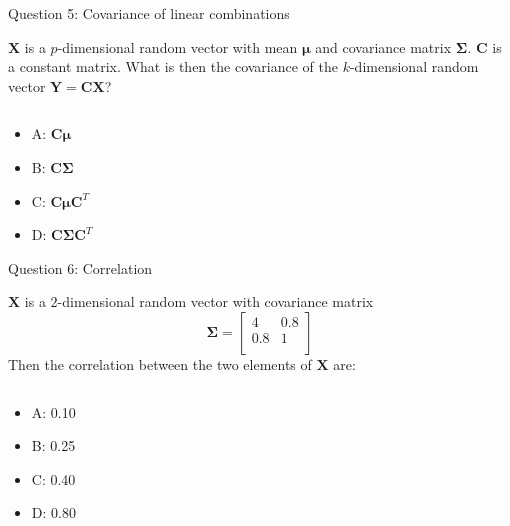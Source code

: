 \documentclass[ignorenonframetext,]{beamer}
\providecommand{\tightlist}{%
  \setlength{\itemsep}{0pt}\setlength{\parskip}{0pt}}
\begin{document}
\begin{frame}

\begin{block}{Question 5: Covariance of linear combinations}

\vspace{2mm}

\(\boldsymbol{X}\) is a \(p\)-dimensional random vector with mean
\(\boldsymbol{\mu}\) and covariance matrix \(\boldsymbol\Sigma\).
\(\boldsymbol{C}\) is a constant matrix. What is then the covariance of
the \(k\)-dimensional random vector
\(\boldsymbol{Y}=\boldsymbol{C}\boldsymbol{X}\)?

\(~\)

\begin{itemize}
\tightlist
\item
  A: \(\boldsymbol{C}\boldsymbol{\mu}\)
\item
  B: \(\boldsymbol{C}\boldsymbol\Sigma\)
\item
  C: \(\boldsymbol{C}\boldsymbol{\mu}\boldsymbol{C}^T\)
\item
  D: \(\boldsymbol{C}\boldsymbol\Sigma\boldsymbol{C}^T\)
\end{itemize}

\end{block}

\end{frame}

\begin{frame}

\begin{block}{Question 6: Correlation}

\vspace{2mm}

\(\boldsymbol{X}\) is a \(2\)-dimensional random vector with covariance
matrix \[ \boldsymbol\Sigma= \left[\begin{array}{cc}
          4 & 0.8 \\
          0.8 & 1\\
      \end{array}
    \right]\] Then the correlation between the two elements of
\(\boldsymbol{X}\) are:

\(~\)

\begin{itemize}
\tightlist
\item
  A: 0.10
\item
  B: 0.25
\item
  C: 0.40
\item
  D: 0.80
\end{itemize}

\end{block}

\end{frame}
\end{document}
